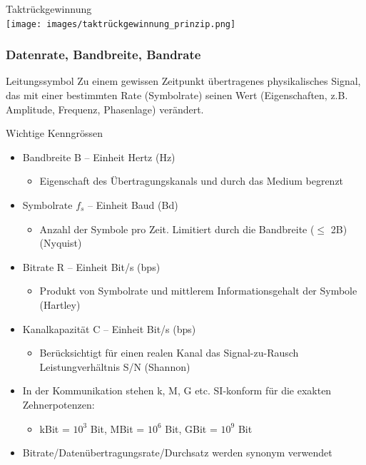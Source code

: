 \begin{definition}{Taktrückgewinnung}\\
    \texttt{[image: images/taktrückgewinnung\_prinzip.png]}
\end{definition}

\subsubsection{Datenrate, Bandbreite, Bandrate}

\begin{definition}{Leitungssymbol}
    Zu einem gewissen Zeitpunkt übertragenes physikalisches Signal, das mit einer bestimmten Rate (Symbolrate) seinen Wert (Eigenschaften, z.B. Amplitude, Frequenz, Phasenlage) verändert.
\end{definition}

\begin{KR}{Wichtige Kenngrössen}
    \begin{itemize}
        \item Bandbreite B – Einheit Hertz (Hz)
        \begin{itemize}
            \item Eigenschaft des Übertragungskanals und durch das Medium begrenzt
        \end{itemize}
        \item Symbolrate $f_s$ – Einheit Baud (Bd)
        \begin{itemize}
            \item Anzahl der Symbole pro Zeit. Limitiert durch die Bandbreite ($\leq$ 2B) (Nyquist)
        \end{itemize}
        \item Bitrate R – Einheit Bit/s (bps)
        \begin{itemize}
            \item Produkt von Symbolrate und mittlerem Informationsgehalt der Symbole (Hartley)
        \end{itemize}
        \item Kanalkapazität C – Einheit Bit/s (bps)
        \begin{itemize}
            \item Berücksichtigt für einen realen Kanal das Signal-zu-Rausch Leistungverhältnis S/N (Shannon)
        \end{itemize}
    \end{itemize}
\end{KR}

\begin{remark}
    \begin{itemize}
        \item In der Kommunikation stehen k, M, G etc. SI-konform für die exakten Zehnerpotenzen:
        \begin{itemize}
            \item kBit = $10^3$ Bit, MBit = $10^6$ Bit, GBit = $10^9$ Bit
        \end{itemize}
        \item Bitrate/Datenübertragungsrate/Durchsatz werden synonym verwendet
    \end{itemize}
\end{remark}

